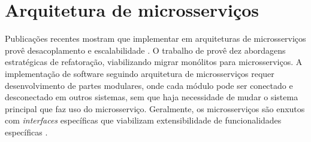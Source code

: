 









\section{Arquitetura de microsserviços}
\label{sec:arq_micro}

Publicações recentes mostram que implementar em arquiteturas de microsserviços provê desacoplamento e escalabilidade \cite{carrasco2018migrating, bavskarada2018architecting, zdun2019emerging}. O trabalho de \textcite{fritzsch2018monolith} provê dez abordagens estratégicas de refatoração, viabilizando migrar monólitos para microsserviços. A implementação de software seguindo arquitetura de microsserviços requer desenvolvimento de partes modulares, onde cada módulo pode ser conectado e desconectado em outros sistemas, sem que haja necessidade de mudar o sistema principal que faz uso do microsserviço. Geralmente, os microsserviços são enxutos com \textit{interfaces} específicas que viabilizam extensibilidade de funcionalidades específicas \cite{journals/software/JamshidiPMLT18}.


